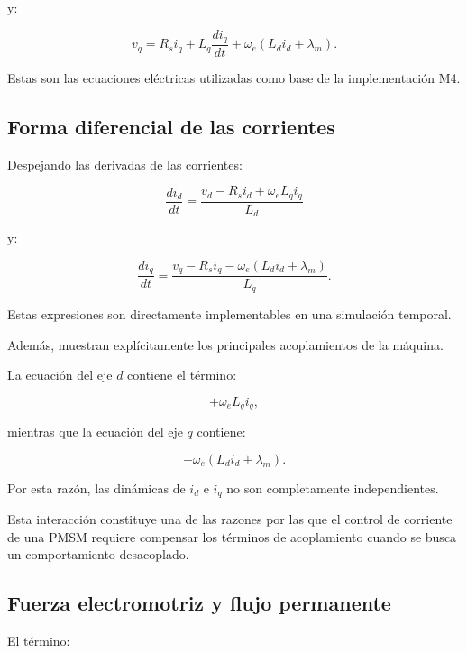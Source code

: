 y:

\begin{equation}
v_q
=
R_si_q
+
L_q\frac{di_q}{dt}
+
\omega_e
\left(
L_di_d+\lambda_m
\right).
\end{equation}

Estas son las ecuaciones eléctricas utilizadas como base de la implementación M4.

\subsection{Forma diferencial de las corrientes}

Despejando las derivadas de las corrientes:

\begin{equation}
\frac{di_d}{dt}
=
\frac{
v_d-R_si_d+\omega_eL_qi_q
}{L_d}
\end{equation}

y:

\begin{equation}
\frac{di_q}{dt}
=
\frac{
v_q-R_si_q-\omega_e(L_di_d+\lambda_m)
}{L_q}.
\end{equation}

Estas expresiones son directamente implementables en una simulación temporal.

Además, muestran explícitamente los principales acoplamientos de la máquina.

La ecuación del eje $d$ contiene el término:

\begin{equation}
+\omega_eL_qi_q,
\end{equation}

mientras que la ecuación del eje $q$ contiene:

\begin{equation}
-\omega_e(L_di_d+\lambda_m).
\end{equation}

Por esta razón, las dinámicas de $i_d$ e $i_q$ no son completamente independientes.

Esta interacción constituye una de las razones por las que el control de corriente de una PMSM requiere compensar los términos de acoplamiento cuando se busca un comportamiento desacoplado.

\subsection{Fuerza electromotriz y flujo permanente}

El término:

